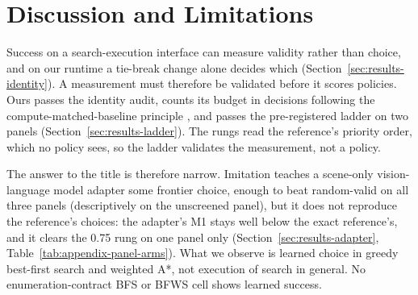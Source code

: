 \section{Discussion and Limitations}
\label{sec:discussion}

Success on a search-execution interface can measure validity rather than choice, and on our runtime a tie-break change alone decides which (Section~\ref{sec:results-identity}). A measurement must therefore be validated before it scores policies. Ours passes the identity audit, counts its budget in decisions following the compute-matched-baseline principle \citep{li2019random}, and passes the pre-registered ladder on two panels (Section~\ref{sec:results-ladder}).
The rungs read the reference's priority order, which no policy sees, so the ladder validates the measurement, not a policy.

The answer to the title is therefore narrow. Imitation teaches a scene-only vision-language model adapter some frontier choice, enough to beat random-valid on all three panels (descriptively on the unscreened panel), but it does not reproduce the reference's choices: the adapter's M1 stays well below the exact reference's, and it clears the 0.75 rung on one panel only (Section~\ref{sec:results-adapter}, Table~\ref{tab:appendix-panel-arms}). What we observe is learned choice in greedy best-first search and weighted A*, not execution of search in general.
No enumeration-contract BFS or BFWS cell shows learned success.

